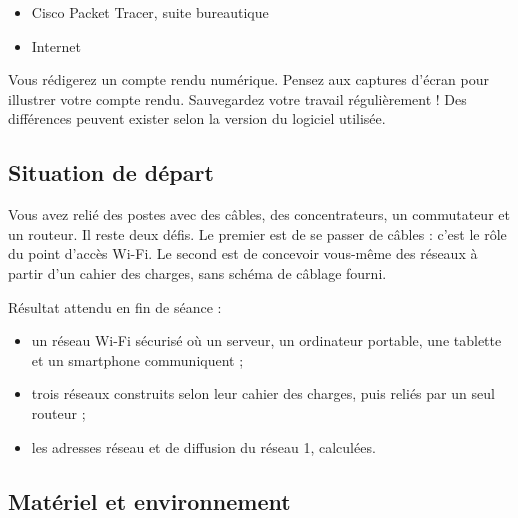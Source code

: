 \documentclass[
  french,
  10pt,
  a4paper,
]{scrartcl}
\providecommand{\tightlist}{%
  \setlength{\itemsep}{0pt}\setlength{\parskip}{0pt}}
\begin{document}
\begin{tcolorbox}[enhanced jigsaw, arc=.35mm, bottomrule=.15mm, bottomtitle=1mm, breakable, colback=white, colbacktitle=quarto-callout-tip-color!10!white, colframe=quarto-callout-tip-color-frame, coltitle=black, left=2mm, leftrule=.75mm, opacityback=0, opacitybacktitle=0.6, rightrule=.15mm, title=\textcolor{quarto-callout-tip-color}{\faLightbulb}\hspace{0.5em}{Support d'activité}, titlerule=0mm, toprule=.15mm, toptitle=1mm]

\begin{itemize}
\tightlist
\item
  Cisco Packet Tracer, suite bureautique
\item
  Internet
\end{itemize}

\end{tcolorbox}

Vous rédigerez un compte rendu numérique. Pensez aux captures d'écran
pour illustrer votre compte rendu. Sauvegardez votre travail
régulièrement ! Des différences peuvent exister selon la version du
logiciel utilisée.

\subsection{Situation de départ}\label{situation-de-duxe9part}

Vous avez relié des postes avec des câbles, des concentrateurs, un
commutateur et un routeur. Il reste deux défis. Le premier est de se
passer de câbles : c'est le rôle du point d'accès Wi-Fi. Le second est
de concevoir vous-même des réseaux à partir d'un cahier des charges,
sans schéma de câblage fourni.

Résultat attendu en fin de séance :

\begin{itemize}
\tightlist
\item
  un réseau Wi-Fi sécurisé où un serveur, un ordinateur portable, une
  tablette et un smartphone communiquent ;
\item
  trois réseaux construits selon leur cahier des charges, puis reliés
  par un seul routeur ;
\item
  les adresses réseau et de diffusion du réseau 1, calculées.
\end{itemize}

\subsection{Matériel et
environnement}\label{matuxe9riel-et-environnement}
\end{document}
